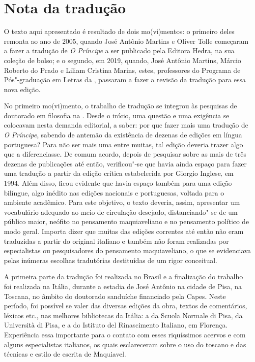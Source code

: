 \chapter{Nota da tradução}

O texto aqui apresentado é resultado de dois mo(vi)mentos: o primeiro
deles remonta ao ano de 2005, quando José Antônio Martins e Oliver Tolle
começaram a fazer a tradução de \emph{O Príncipe} a ser publicado pela
Editora Hedra, na sua coleção de bolso; e o segundo, em 2019, quando,
José Antônio Martins, Márcio Roberto do Prado e Liliam Cristina Marins,
estes, professores do Programa de Pós"-graduação em Letras da ,
passaram a fazer a revisão da tradução para essa nova edição.

No primeiro mo(vi)mento, o trabalho de tradução se integrou às pesquisas
de doutorado em filosofia na . Desde o início, uma questão e uma
exigência se colocavam nesta demanda editorial, a saber: por que fazer
mais uma tradução de \emph{O Príncipe}, sabendo de antemão da existência
de dezenas de edições em língua portuguesa? Para não ser mais uma entre
muitas, tal edição deveria trazer algo que a diferenciasse. De comum
acordo, depois de pesquisar sobre as mais de três dezenas de publicações
até então, verificou"-se que havia ainda espaço para fazer uma tradução a
partir da edição crítica estabelecida por Giorgio Inglese, em 1994. Além
disso, ficou evidente que havia espaço também para uma edição bilíngue,
algo inédito nas edições nacionais e portuguesas, voltada para o
ambiente acadêmico. Para este objetivo, o texto deveria, assim,
apresentar um vocabulário adequado ao meio de circulação desejado,
distanciando"-se de um público maior, neófito no pensamento maquiaveliano
e no pensamento político de modo geral. Importa dizer que muitas das
edições correntes até então não eram traduzidas a partir do original
italiano e também não foram realizadas por especialistas ou
pesquisadores do pensamento maquiaveliano, o que se evidenciava pelas
inúmeras escolhas tradutórias destituídas de um rigor conceitual.

A primeira parte da tradução foi realizada no Brasil e a finalização do
trabalho foi realizada na Itália, durante a estadia de José Antônio na
cidade de Pisa, na Toscana, no âmbito do doutorado sanduíche financiado
pela Capes. Neste período, foi possível se valer das diversas edições da
obra, textos de comentários, léxicos etc., nas melhores bibliotecas da
Itália: a da Scuola Normale di Pisa, da Università di Pisa, e a do
Istituto del Rinascimento Italiano, em Florença. Experiência essa
importante para o contato com esses riquíssimos acervos e com alguns
especialistas italianos, os quais esclareceram sobre o uso do toscano e
das técnicas e estilo de escrita de Maquiavel.

